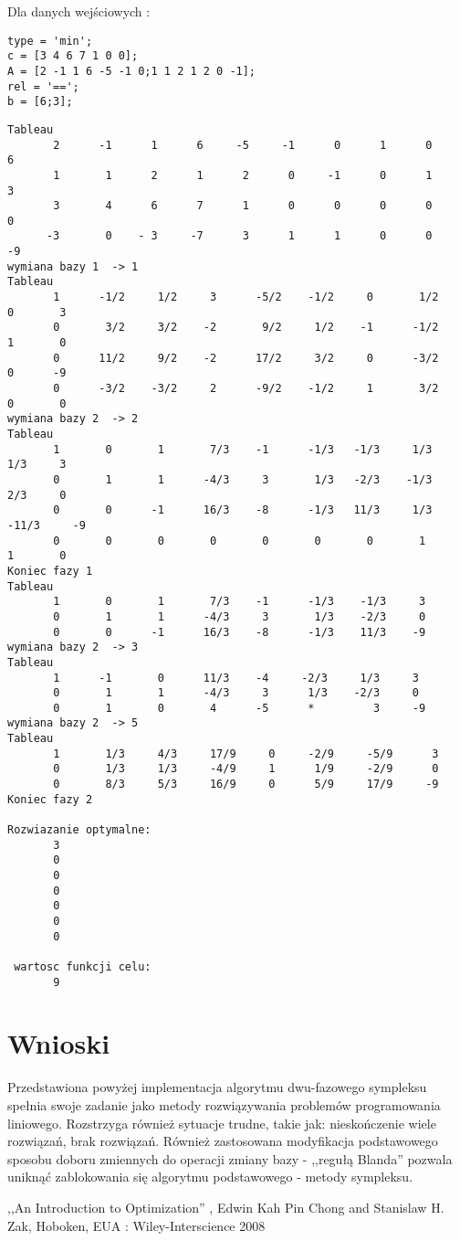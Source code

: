 \documentclass{classrep}
\begin{document}
Dla danych wejściowych :


\begin{Verbatim}[frame=lines]
type = 'min';
c = [3 4 6 7 1 0 0];
A = [2 -1 1 6 -5 -1 0;1 1 2 1 2 0 -1];
rel = '==';
b = [6;3];
\end{Verbatim}

\begin{Verbatim}[frame=lines]
Tableau
       2      -1      1      6     -5     -1      0      1      0      6 
       1       1      2      1      2      0     -1      0      1      3
       3       4      6      7      1      0      0      0      0      0
      -3       0    - 3     -7      3      1      1      0      0     -9 
wymiana bazy 1  -> 1
Tableau
       1      -1/2     1/2     3      -5/2    -1/2     0       1/2     0       3
       0       3/2     3/2    -2       9/2     1/2    -1      -1/2     1       0
       0      11/2     9/2    -2      17/2     3/2     0      -3/2     0      -9
       0      -3/2    -3/2     2      -9/2    -1/2     1       3/2     0       0
wymiana bazy 2  -> 2
Tableau
       1       0       1       7/3    -1      -1/3   -1/3     1/3     1/3     3
       0       1       1      -4/3     3       1/3   -2/3    -1/3     2/3     0
       0       0      -1      16/3    -8      -1/3   11/3     1/3   -11/3     -9
       0       0       0       0       0       0       0       1       1       0
Koniec fazy 1
Tableau
       1       0       1       7/3    -1      -1/3    -1/3     3       
       0       1       1      -4/3     3       1/3    -2/3     0       
       0       0      -1      16/3    -8      -1/3    11/3    -9       
wymiana bazy 2  -> 3
Tableau
       1      -1       0      11/3    -4     -2/3     1/3     3       
       0       1       1      -4/3     3      1/3    -2/3     0       
       0       1       0       4      -5      *         3	  -9       
wymiana bazy 2  -> 5
Tableau
       1       1/3     4/3     17/9     0     -2/9     -5/9      3       
       0       1/3     1/3     -4/9     1      1/9     -2/9      0       
       0       8/3     5/3     16/9     0      5/9     17/9     -9       
Koniec fazy 2

Rozwiazanie optymalne:
       3       
       0       
       0       
       0       
       0       
       0       
       0       

 wartosc funkcji celu:
       9    
\end{Verbatim}

\section{Wnioski}
Przedstawiona powyżej implementacja algorytmu dwu-fazowego sympleksu spełnia swoje zadanie jako metody rozwiązywania problemów programowania liniowego. Rozstrzyga również sytuacje trudne, takie jak: nieskończenie wiele rozwiązań, brak rozwiązań. Również zastosowana modyfikacja podstawowego sposobu doboru zmiennych do operacji zmiany bazy - ,,regułą Blanda'' pozwala uniknąć zablokowania się algorytmu podstawowego - metody sympleksu.

\begin{thebibliography}{9}
 ,,An Introduction to Optimization'' , Edwin Kah Pin Chong and Stanislaw H. Zak, Hoboken, EUA : Wiley-Interscience 2008
\end{thebibliography}
\end{document}
